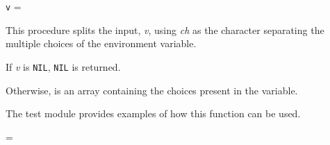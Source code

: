 \begin{precondition}
  \texttt{v} = \nil \logicalor {}
\end{precondition}

\begin{semantics}
This procedure splits the input, \emph{v}, using \emph{ch} as the
character separating the multiple choices of the environment variable.

If \emph{v} is \texttt{NIL}, \texttt{NIL} is returned.

Otherwise, \result is an array containing the choices present in the
variable.

The test module provides examples of how this function can be used.
\end{semantics}

\begin{postcondition}
  \result = \nil \logicalor \validfn{\result\deref}
\end{postcondition}

